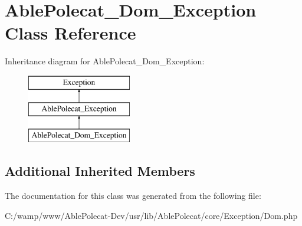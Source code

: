 \hypertarget{class_able_polecat___dom___exception}{}\section{Able\+Polecat\+\_\+\+Dom\+\_\+\+Exception Class Reference}
\label{class_able_polecat___dom___exception}
Inheritance diagram for Able\+Polecat\+\_\+\+Dom\+\_\+\+Exception\+:\begin{figure}[H]
\begin{center}
\leavevmode
\includegraphics[height=3.000000cm]{class_able_polecat___dom___exception}
\end{center}
\end{figure}
\subsection*{Additional Inherited Members}


The documentation for this class was generated from the following file\+:\begin{DoxyCompactItemize}
\item 
C\+:/wamp/www/\+Able\+Polecat-\/\+Dev/usr/lib/\+Able\+Polecat/core/\+Exception/Dom.\+php\end{DoxyCompactItemize}
